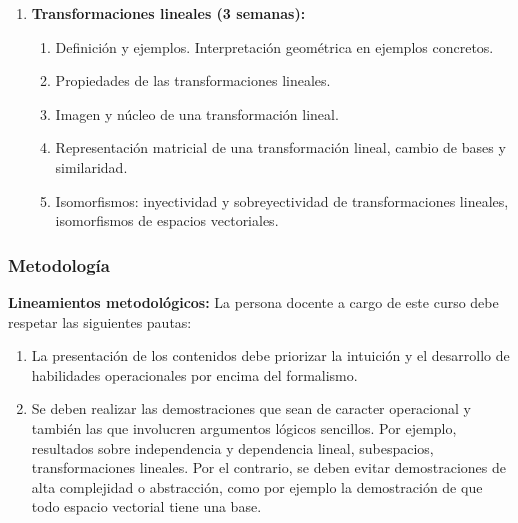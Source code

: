 \begin{refsection}
\begin{enumerate}
\item \textbf{Transformaciones lineales (3 semanas):} 
\begin{enumerate}
    \item Definición y ejemplos. Interpretación geométrica en ejemplos concretos.
    \item Propiedades de las transformaciones lineales. 
    \item Imagen y núcleo de una transformación lineal.
    \item Representación matricial de una transformación lineal, cambio de bases y similaridad.
    \item Isomorfismos: inyectividad y sobreyectividad de transformaciones lineales, isomorfismos de espacios vectoriales.
\end{enumerate}

\end{enumerate}

\subsubsection*{Metodología}

\noindent \textbf{Lineamientos metodológicos:} La persona docente a cargo de este curso debe respetar las siguientes pautas:
\begin{enumerate}
    \item La presentación de los contenidos debe priorizar la intuición y el desarrollo de habilidades operacionales por encima del formalismo. 
    \item Se deben realizar las demostraciones que sean de caracter operacional y también las que involucren argumentos lógicos sencillos. Por ejemplo, resultados sobre independencia y dependencia lineal, subespacios, transformaciones lineales. Por el contrario, se deben evitar demostraciones de alta complejidad o abstracción, como por ejemplo la demostración de que todo espacio vectorial tiene una base.
\end{enumerate}


\end{refsection}
